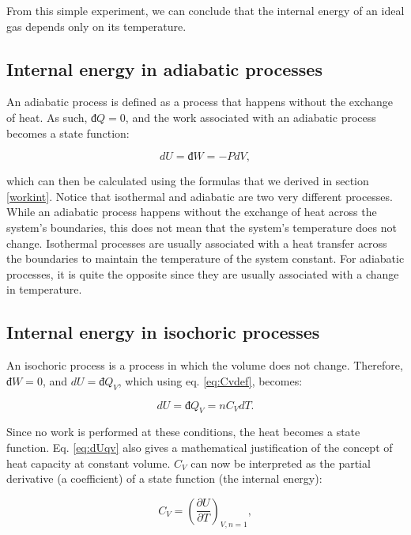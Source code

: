 \documentclass[
  9pt,
]{extbook}
\theoremstyle{definition}
\theoremstyle{definition}
\theoremstyle{definition}
\theoremstyle{definition}
\theoremstyle{remark}
\begin{document}
From this simple experiment, we can conclude that the internal energy of an ideal gas depends only on its temperature.

\subsection{Internal energy in adiabatic processes}\label{internal-energy-in-adiabatic-processes}

An adiabatic process is defined as a process that happens without the exchange of heat. As such, \(đ Q=0\), and the work associated with an adiabatic process becomes a state function:

\begin{equation}
  dU=đ W=-PdV,
  \label{eq:dUadiabatic}
\end{equation}

which can then be calculated using the formulas that we derived in section \ref{workint}. Notice that isothermal and adiabatic are two very different processes. While an adiabatic process happens without the exchange of heat across the system's boundaries, this does not mean that the system's temperature does not change. Isothermal processes are usually associated with a heat transfer across the boundaries to maintain the temperature of the system constant. For adiabatic processes, it is quite the opposite since they are usually associated with a change in temperature.

\subsection{Internal energy in isochoric processes}\label{internal-energy-in-isochoric-processes}

An isochoric process is a process in which the volume does not change. Therefore, \(đ W=0\), and \(dU = đ Q_V\), which using eq. \eqref{eq:Cvdef}, becomes:

\begin{equation}
  dU = đ Q_V = n C_V dT.
  \label{eq:dUqv}
\end{equation}

Since no work is performed at these conditions, the heat becomes a state function. Eq. \eqref{eq:dUqv} also gives a mathematical justification of the concept of heat capacity at constant volume. \(C_V\) can now be interpreted as the partial derivative (a coefficient) of a state function (the internal energy):

\begin{equation}
  C_V = \left( \frac{\partial U} {\partial T} \right)_{V,n=1},
  \label{eq:cvstatefunc}
\end{equation}
\end{document}
